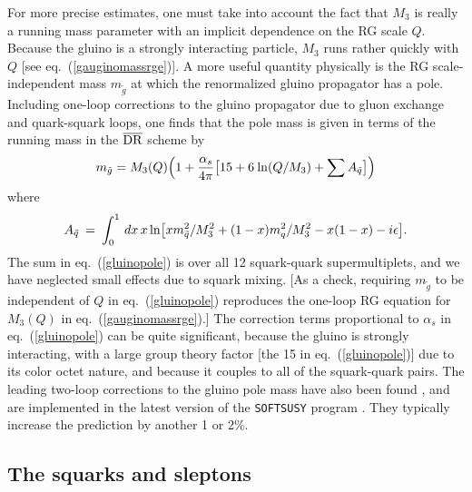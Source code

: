 \documentclass[11pt]{article}
\def\beq{\begin{eqnarray}}
\def\eeq{\end{eqnarray}}
\def\drbar{\overline{\rm DR}}
\begin{document}
For more precise estimates, one must take into account the fact that $M_3$ 
is really a running mass parameter with an implicit dependence on the RG 
scale $Q$. Because the gluino is a strongly interacting particle, $M_3$ 
runs rather quickly with $Q$ [see eq.~(\ref{gauginomassrge})]. A more 
useful quantity physically is the RG scale-independent mass $m_{\tilde g}$ 
at which the renormalized gluino propagator has a pole. Including one-loop 
corrections to the gluino propagator due to gluon exchange and 
quark-squark loops, one finds that the pole mass is given in terms of the 
running mass in the $\drbar$ scheme by \cite{gluinopolemass}
\beq
m_{\tilde g} = M_3(Q) \Bigl ( 1 + {\alpha_s\over 4 \pi}
\bigl [ 15 + 6\> {\rm ln}(Q/ M_3) + \sum A_{\tilde q}\bigr ] \Bigr )
\label{gluinopole}
\eeq
where
\beq
A_{\tilde q} \>=\> \int_0^1 \, dx \, x \, {\rm ln}
\bigl [
x m_{\tilde q}^2/M_3^2 + (1-x) m_{q}^2/M_3^2 - x(1-x) - i \epsilon
\bigr ].
\eeq
The sum in eq.~(\ref{gluinopole}) is over all 12 squark-quark 
supermultiplets, and we have neglected small effects due to squark mixing. 
[As a check, requiring $m_{\tilde g}$ to be independent of $Q$ in 
eq.~(\ref{gluinopole}) reproduces the one-loop RG equation for $M_3(Q)$ in 
eq.~(\ref{gauginomassrge}).] The correction terms proportional to 
$\alpha_s$ in eq.~(\ref{gluinopole}) can be quite significant,
because the gluino is strongly interacting, with a large group 
theory factor [the 15 in eq.~(\ref{gluinopole})] due to its color octet 
nature, and because it couples to all of the squark-quark pairs. The leading 
two-loop corrections to the gluino pole mass have also been found 
\cite{gluinopoletwo,GNCpoletwo,Martin:2006ub}, and are implemented in the latest
version of the {\tt SOFTSUSY} program \cite{SOFTSUSY}. 
They typically increase the prediction by another 1 or 2\%.

\subsection{The squarks and sleptons\label{subsec:MSSMspectrum.sfermions}}
\setcounter{equation}{0}
\setcounter{footnote}{1}
\end{document}
